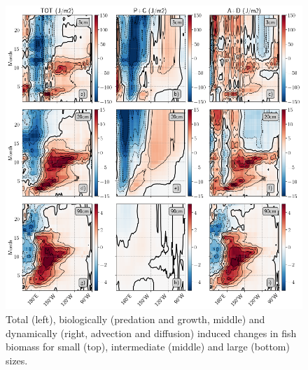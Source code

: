 \begin{figure}[h!tp]
	\centering
	\includegraphics[scale=0.4]{figs/fig7.png}	
	\caption{Total (left), biologically (predation and growth, middle) and dynamically (right, advection and diffusion) induced changes in fish biomass for small (top), intermediate (middle) and large (bottom) sizes.}
	\label{fig:fig7}
\end{figure}

